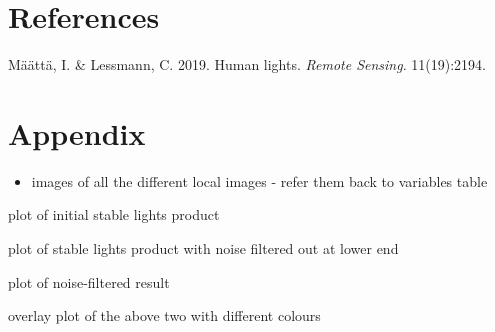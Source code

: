 \documentclass[11pt,preprint, authoryear]{elsarticle}
\numberwithin{equation}{section}
\numberwithin{figure}{section}
\numberwithin{table}{section}
\def\tightlist{} %
\newlength{\cslhangindent}
\newenvironment{CSLReferences}%
  {\setlength{\parindent}{0pt}%
  \everypar{\setlength{\hangindent}{\cslhangindent}}\ignorespaces}%
  {\par}
\begin{document}
\newpage

\hypertarget{references}{%
\section*{References}\label{references}}

\hypertarget{refs}{}
\begin{CSLReferences}{1}{0}
\leavevmode{}%
Määttä, I. \& Lessmann, C. 2019. Human lights. \emph{Remote Sensing}.
11(19):2194.

\end{CSLReferences}

\hypertarget{appendix}{%
\section*{Appendix}\label{appendix}}

\begin{itemize}
\tightlist
\item
  images of all the different local images - refer them back to
  variables table
\end{itemize}

plot of initial stable lights product

plot of stable lights product with noise filtered out at lower end

plot of noise-filtered result

overlay plot of the above two with different colours


\end{document}
